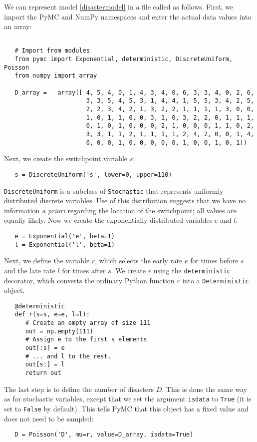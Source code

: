 We can represent model \ref{disastermodel} in a file called  as follows. First, we import the PyMC and NumPy namespaces and enter the actual data values into an array:
\begin{verbatim}
	
   # Import from modules
   from pymc import Exponential, deterministic, DiscreteUniform, Poisson
   from numpy import array

   D_array =   array([ 4, 5, 4, 0, 1, 4, 3, 4, 0, 6, 3, 3, 4, 0, 2, 6,
                       3, 3, 5, 4, 5, 3, 1, 4, 4, 1, 5, 5, 3, 4, 2, 5,
                       2, 2, 3, 4, 2, 1, 3, 2, 2, 1, 1, 1, 1, 3, 0, 0,
                       1, 0, 1, 1, 0, 0, 3, 1, 0, 3, 2, 2, 0, 1, 1, 1,
                       0, 1, 0, 1, 0, 0, 0, 2, 1, 0, 0, 0, 1, 1, 0, 2,
                       3, 3, 1, 1, 2, 1, 1, 1, 1, 2, 4, 2, 0, 0, 1, 4,
                       0, 0, 0, 1, 0, 0, 0, 0, 0, 1, 0, 0, 1, 0, 1])
\end{verbatim} 
Next, we create the switchpoint variable $s$:
\begin{verbatim}
   s = DiscreteUniform('s', lower=0, upper=110)   
\end{verbatim}
\texttt{DiscreteUniform} is a subclass of \texttt{Stochastic} that represents uniformly-distributed discrete variables. Use of this distribution suggests that we have no information \emph{a priori} regarding the location of the switchpoint; all values are equally likely. Now we create the exponentially-distributed variables $e$ and $l$:
\begin{verbatim}
   e = Exponential('e', beta=1)
   l = Exponential('l', beta=1)   
\end{verbatim}
Next, we define the variable $r$, which selects the early rate $e$ for times before $s$ and the late rate $l$ for times after $s$. We create $r$ using the \texttt{deterministic} decorator, which converts the ordinary Python function $r$ into a \texttt{Deterministic} object.
\begin{verbatim}
   @deterministic
   def r(s=s, e=e, l=l):
      # Create an empty array of size 111
      out = np.empty(111)
      # Assign e to the first s elements
      out[:s] = e
      # ... and l to the rest.
      out[s:] = l
      return out
\end{verbatim}
The last step is to define the number of disasters $D$. This is done the same way as for stochastic variables, except that we set the argument \texttt{isdata} to \texttt{True} (it is set to \texttt{False} by default). This tells PyMC that this object has a fixed value and does not need to be sampled:
\begin{verbatim}
   D = Poisson('D', mu=r, value=D_array, isdata=True)
\end{verbatim}

